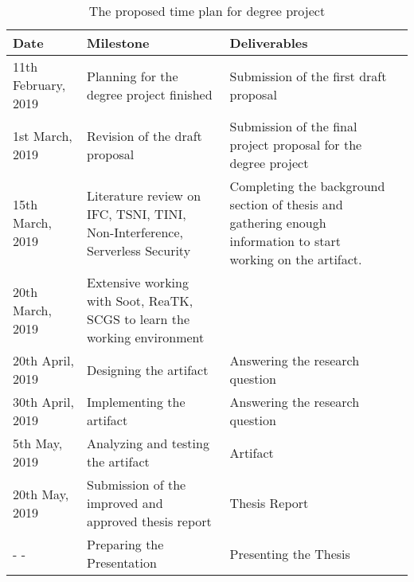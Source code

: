 \begin{table}[htbp]
	\begin{tabularx}{\textwidth}{l X X l}
		\toprule
		\rowcolor[HTML]{34CDF9} 
		\textbf{Date} & \textbf{Milestone} & \textbf{Deliverables} \\ \midrule
		11th February, 2019 & Planning for the degree project finished & Submission of the first draft proposal \\ \midrule
		1st March, 2019 & Revision of the draft proposal & Submission of the final project proposal for the degree project \\ \midrule
		15th March, 2019 & Literature review on IFC, TSNI, TINI, Non-Interference, Serverless Security & Completing the background section of thesis and gathering enough information to start working on the artifact. \\ \midrule
		20th March, 2019 & Extensive working with Soot, ReaTK, SCGS to learn the working environment &  \\ \midrule
		20th April, 2019 & Designing the artifact & Answering the research question \\ \midrule
		30th April, 2019 & Implementing the artifact & Answering the research question \\ \midrule
		5th May, 2019 & Analyzing and testing the artifact & Artifact \\ \midrule
		20th May, 2019 & Submission of the improved and approved thesis report & Thesis Report \\ \midrule
		- - & Preparing the Presentation & Presenting the Thesis \\ \bottomrule
	\end{tabularx}
	\caption{The proposed time plan for degree project}
	\label{table:timePlan}
\end{table}